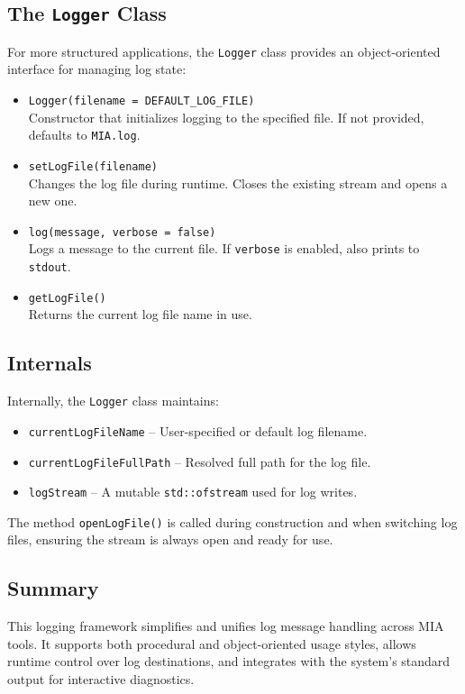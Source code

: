 \subsection{The \texttt{Logger} Class}
For more structured applications, the \texttt{Logger} class provides an object-oriented interface for managing log state:

\begin{itemize}
	\item \texttt{Logger(filename = DEFAULT\_LOG\_FILE)}\\
	Constructor that initializes logging to the specified file. If not provided, defaults to \texttt{MIA.log}.
	
	\item \texttt{setLogFile(filename)}\\
	Changes the log file during runtime. Closes the existing stream and opens a new one.
	
	\item \texttt{log(message, verbose = false)}\\
	Logs a message to the current file. If \texttt{verbose} is enabled, also prints to \texttt{stdout}.
	
	\item \texttt{getLogFile()}\\
	Returns the current log file name in use.
\end{itemize}

\subsection{Internals}
Internally, the \texttt{Logger} class maintains:

\begin{itemize}
	\item \texttt{currentLogFileName} -- User-specified or default log filename.
	\item \texttt{currentLogFileFullPath} -- Resolved full path for the log file.
	\item \texttt{logStream} -- A mutable \texttt{std::ofstream} used for log writes.
\end{itemize}

The method \texttt{openLogFile()} is called during construction and when switching log files, ensuring the stream is always open and ready for use.

\subsection{Summary}
This logging framework simplifies and unifies log message handling across MIA tools. It supports both procedural and object-oriented usage styles, allows runtime control over log destinations, and integrates with the system's standard output for interactive diagnostics.





